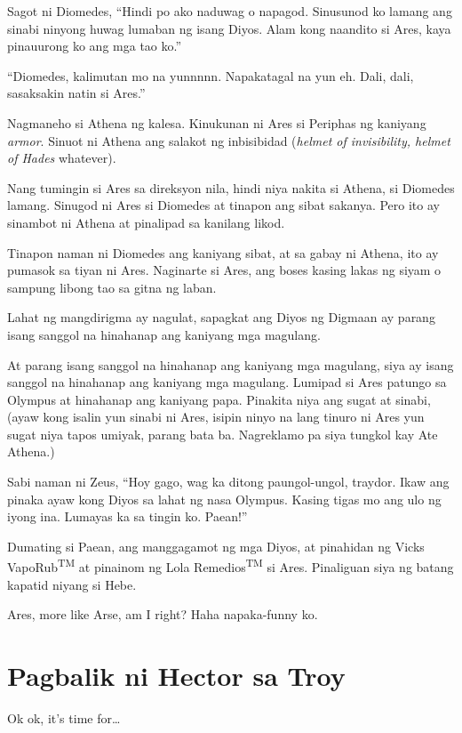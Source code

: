 \documentclass[12pt,letterpaper]{report}
\begin{document}
Sagot ni Diomedes, ``Hindi po ako naduwag o napagod. Sinusunod ko lamang ang sinabi ninyong huwag lumaban ng isang Diyos. Alam kong naandito si Ares, kaya pinauurong ko ang mga tao ko.''

``Diomedes, kalimutan mo na yunnnnn. Napakatagal na yun eh. Dali, dali, sasaksakin natin si Ares.''

Nagmaneho si Athena ng kalesa. Kinukunan ni Ares si Periphas ng kaniyang \textit{armor}. Sinuot ni Athena ang salakot ng inbisibidad (\textit{helmet of invisibility, helmet of Hades} whatever).

Nang tumingin si Ares sa direksyon nila, hindi niya nakita si Athena, si Diomedes lamang. Sinugod ni Ares si Diomedes at tinapon ang sibat sakanya. Pero ito ay sinambot ni Athena at pinalipad sa kanilang likod.

Tinapon naman ni Diomedes ang kaniyang sibat, at sa gabay ni Athena, ito ay pumasok sa tiyan ni Ares. Naginarte si Ares, ang boses kasing lakas ng siyam o sampung libong tao sa gitna ng laban.

Lahat ng mangdirigma ay nagulat, sapagkat ang Diyos ng Digmaan ay parang isang sanggol na hinahanap ang kaniyang mga magulang.

At parang isang sanggol na hinahanap ang kaniyang mga magulang, siya ay isang sanggol na hinahanap ang kaniyang mga magulang. Lumipad si Ares patungo sa Olympus at hinahanap ang kaniyang papa. Pinakita niya ang sugat at sinabi, (ayaw kong isalin yun sinabi ni Ares, isipin ninyo na lang tinuro ni Ares yun sugat niya tapos umiyak, parang bata ba. Nagreklamo pa siya tungkol kay Ate Athena.)

Sabi naman ni Zeus, ``Hoy gago, wag ka ditong paungol-ungol, traydor. Ikaw ang pinaka ayaw kong Diyos sa lahat ng nasa Olympus. Kasing tigas mo ang ulo ng iyong ina. Lumayas ka sa tingin ko. Paean!''

Dumating si Paean, ang manggagamot ng mga Diyos, at pinahidan ng Vicks VapoRub\textsuperscript{TM} at pinainom ng Lola Remedios\textsuperscript{TM} si Ares. Pinaliguan siya ng batang kapatid niyang si Hebe.

Ares, more like Arse, am I right? Haha napaka-funny ko.

\pagebreak
\chapter{Pagbalik ni Hector sa Troy} %

Ok ok, it's time for\dots
\end{document}
